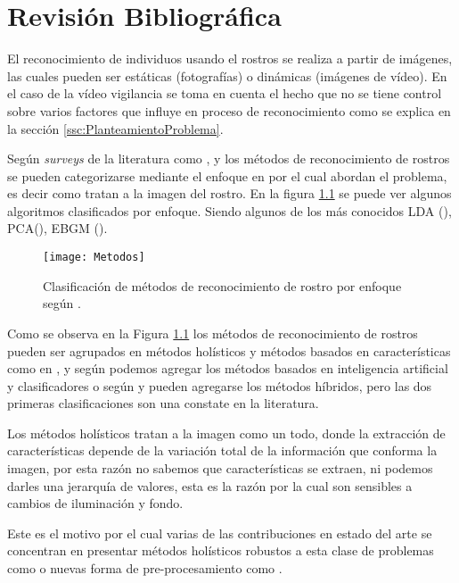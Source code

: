 \chapter{Revisión Bibliográfica} \label{chap:Revision}
El reconocimiento de individuos usando el rostros se realiza a partir de imágenes, las cuales pueden ser estáticas (fotografías) o dinámicas (imágenes de vídeo). En el caso de la vídeo vigilancia se toma en cuenta el hecho que no se tiene control sobre varios factores que influye en proceso de reconocimiento como se explica en la sección \ref{ssc:PlanteamientoProblema}.

Según \textit{surveys} de la literatura como \cite{zhao2003face}, \cite{parmar2014face} y \cite{pandya2013survey} los métodos de reconocimiento de rostros se pueden categorizarse mediante el enfoque en por el cual abordan el problema, es decir como tratan a la imagen del rostro. En la figura \ref{im:metodos} se puede ver algunos algoritmos clasificados por enfoque. Siendo algunos de los más conocidos \acf{LDA} (\cite{zhao1999subspace}), \acf{PCA}(\cite{turk1991eigenfaces}), \acf{EBGM} (\cite{wiskott1997face}). %
\begin{figure}[h]
\center
\texttt{[image: Metodos]}
\caption{Clasificación de métodos de reconocimiento de rostro por enfoque según \cite{zhao2003face}.}
\label{im:metodos}
\end{figure}

Como se observa en la Figura \ref{im:metodos} los métodos de reconocimiento de rostros pueden ser agrupados en métodos holísticos y métodos basados en características como en  \cite{tseng2003comparison} , y según \cite{zhao2003face} podemos agregar los métodos basados en inteligencia artificial y clasificadores o según \cite{parmar2014face} y \cite{pandya2013survey} pueden agregarse los métodos híbridos, pero las dos primeras clasificaciones son una constate en la literatura.

Los métodos holísticos tratan a la imagen como un todo, donde la extracción de características depende de la variación total de la información que conforma la imagen, por esta razón no sabemos que características se extraen, ni podemos darles una jerarquía de valores, esta es la razón por la cual son sensibles a cambios de iluminación y fondo. 

Este es el motivo por el cual varias de las contribuciones en estado del arte se concentran en presentar métodos holísticos robustos a esta clase de problemas como \cite{zhao1999theoretical} o nuevas forma de pre-procesamiento como \cite{gross2003image}.

